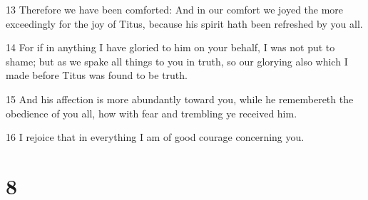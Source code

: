 \par 13 Therefore we have been comforted: And in our comfort we joyed the more exceedingly for the joy of Titus, because his spirit hath been refreshed by you all.
\par 14 For if in anything I have gloried to him on your behalf, I was not put to shame; but as we spake all things to you in truth, so our glorying also which I made before Titus was found to be truth.
\par 15 And his affection is more abundantly toward you, while he remembereth the obedience of you all, how with fear and trembling ye received him.
\par 16 I rejoice that in everything I am of good courage concerning you.

\chapter{8}

